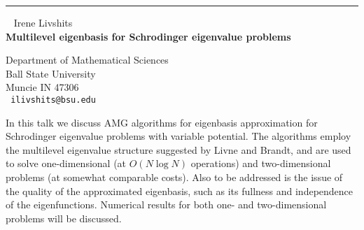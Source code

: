 \documentclass{report}
\begin{document}
\begin{center}

\rule{6in}{1pt} \
{\large
Irene Livshits
\\ {\bf
Multilevel eigenbasis for Schrodinger eigenvalue problems
}}

Department of Mathematical Sciences \\
Ball State University \\
Muncie IN 47306
\\ {\tt
ilivshits@bsu.edu
}
\end{center}

In this talk we discuss AMG algorithms for eigenbasis approximation for
Schrodinger eigenvalue problems with variable potential. The algorithms
employ the multilevel eigenvalue structure suggested by Livne and
Brandt, and are used to solve one-dimensional
(at $O(N\log N)$ operations)
and two-dimensional problems (at somewhat comparable costs). Also to be
addressed is the issue of the quality of the approximated eigenbasis,
such as its fullness and independence of the eigenfunctions. Numerical
results for both one- and two-dimensional problems will be discussed. 
\end{document}
